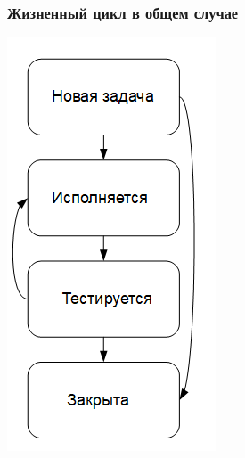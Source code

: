 \documentclass{../industrial-development}
\begin{document}
\begin{frame} \frametitle{Жизненный цикл в общем случае}
	\centerline{\includegraphics[height=0.9\textheight]{cyc1.png}}
\end{frame}
\end{document}
